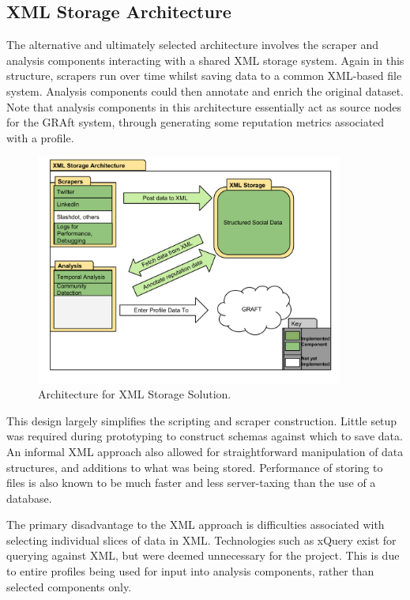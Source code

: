 \subsection{XML Storage Architecture}

The alternative and ultimately selected architecture involves the scraper and analysis components interacting with a shared XML storage system. Again in this structure, scrapers run over time whilst saving data to a common XML-based file system. Analysis components could then annotate and enrich the original dataset. Note that analysis components in this architecture essentially act as source nodes for the GRAft system, through generating some reputation metrics associated with a profile. 

\begin{figure}[h!]
\begin{center}
\centering
\includegraphics[width=0.9\textwidth]{Images/xml_storage_arch_v2.pdf}
\caption{Architecture for XML Storage Solution.}
 \end{center}
\end{figure}
This design largely simplifies the scripting and scraper construction. Little setup was required during prototyping to construct schemas against which to save data. An informal XML approach also allowed for straightforward manipulation of data structures, and additions to what was being stored. Performance of storing to files is also known to be much faster and less server-taxing than the use of a database.

The primary disadvantage to the XML approach is difficulties associated with selecting individual slices of data in XML. Technologies such as xQuery exist for querying against XML, but were deemed unnecessary for the project. This is due to entire profiles being used for input into analysis components, rather than selected components only.

